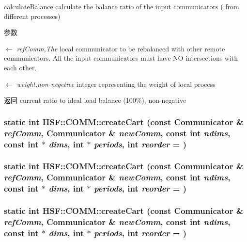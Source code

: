 calculateBalance calculate the balance ratio of the input communicators ( from different processes) 
\begin{DoxyParams}{参数}
\item[\mbox{$\leftarrow$} {\em refComm,The}]local communicator to be rebalanced with other remote communicators. All the input communicators must have NO intersections with each other. \item[\mbox{$\leftarrow$} {\em weight,non-\/negetive}]integer representing the weight of local process \end{DoxyParams}
\begin{DoxyReturn}{返回}
current ratio to ideal load balance (100\%), non-\/negative 
\end{DoxyReturn}
\hypertarget{classHSF_1_1COMM_afcbab02e03ac7f6bce379be298c427de}{
\subsubsection[{createCart}]{\setlength{\rightskip}{0pt plus 5cm}static int HSF::COMM::createCart (const {\bf Communicator} \& {\em refComm}, \/  {\bf Communicator} \& {\em newComm}, \/  const int {\em ndims}, \/  const int $\ast$ {\em dims}, \/  int $\ast$ {\em periods}, \/  int {\em reorder} = {})}}
\label{classHSF_1_1COMM_afcbab02e03ac7f6bce379be298c427de}
\hypertarget{classHSF_1_1COMM_afcbab02e03ac7f6bce379be298c427de}{
\subsubsection[{createCart}]{\setlength{\rightskip}{0pt plus 5cm}static int HSF::COMM::createCart (const {\bf Communicator} \& {\em refComm}, \/  {\bf Communicator} \& {\em newComm}, \/  const int {\em ndims}, \/  const int $\ast$ {\em dims}, \/  int $\ast$ {\em periods}, \/  int {\em reorder} = {})}}
\label{classHSF_1_1COMM_afcbab02e03ac7f6bce379be298c427de}
\hypertarget{classHSF_1_1COMM_afcbab02e03ac7f6bce379be298c427de}{
\subsubsection[{createCart}]{\setlength{\rightskip}{0pt plus 5cm}static int HSF::COMM::createCart (const {\bf Communicator} \& {\em refComm}, \/  {\bf Communicator} \& {\em newComm}, \/  const int {\em ndims}, \/  const int $\ast$ {\em dims}, \/  int $\ast$ {\em periods}, \/  int {\em reorder} = {})}}
